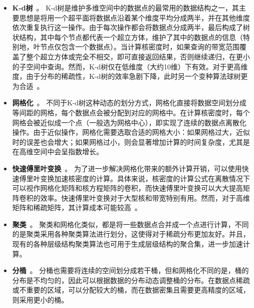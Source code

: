 \begin{itemize}[leftmargin=*]
	\item \textbf{K-d树}~\cite{chan_efficient_2020, chan_quad_2020, chan_karl_2019}。 K-d树是维护多维空间中的数据点的最常用的数据结构之一，其主要思想是将用一个超平面将数据点沿着某个维度平均分成两半，并在其他维度依次重复执行这一操作。由于每次操作都会将数据点分成两半，最后构成了树状结构，其中每个节点都代表一个超立方体，维护了其中的数据点的信息（特别地，叶节点仅包含一个数据点）。当计算核密度时，如果查询的带宽范围覆盖了整个超立方体或完全不相交，即可直接返回结果，否则继续递归，在更小的子空间中查询。然而，K-d树仅在低维度（大约10维）下有效。对于更高维度，由于分布的稀疏性，K-d树的效率急剧下降，此时另一个变种算法球树更为合适~\cite{gray_nonparametric_2003}。
	
	\item \textbf{网格化}~\cite{hart_kernel_2014, black_highway_1991}。 不同于K-d树这种动态的划分方式，网格化直接将数据空间划分成等间距的网格，每个数据点会被分配到对应的网格中。在计算核密度时，每个网格会被近似成一个点（一般选为网格中心），即实现了连续的数据点离散化操作。由于近似操作，网格化需要选取合适的网格大小：如果网格过大，近似时的误差也会增大；如果网格过小，则会显著增加计算的时间复杂度，尤其是在高维空间中会呈指数增长。
	
	\item \textbf{快速傅里叶变换}~\cite{silverman_algorithm_1982, gramacki_nonparametric_2018}。 为了进一步解决网格化带来的额外计算开销，可以使用快速傅里叶变换加速核密度的计算。具体来说，核密度的计算公式在离散情况下可以视作网格化矩阵和核方程矩阵的卷积，而快速傅里叶变换可以大大提高矩阵卷积的效率。快速傅里叶变换对于大型核和带宽特别有用。然而，对于高维矩阵和稀疏矩阵，其计算成本可能较高~\cite{fan_fast_1994}。
	
	\item \textbf{聚类}~\cite{auber_interactive_2005, abello_ask-graphview_2006, hinneburg_denclue_2007}。 聚类和网格化类似，都是将一些数据点合并成一个点进行计算，不同的是聚类采用各种聚类算法进行划分，这使得对于稀疏分布更加友好。并且，现有的各种层级结构聚类算法也可用于生成层级结构的聚合集，进一步加速计算。
	
	\item \textbf{分桶}~\cite{liu_immens_2013, gramacki_nonparametric_2018, li_interactive_2014}。 分桶也需要将连续的空间划分成若干桶，但和网格化不同的是，桶的分布是不均匀的，因此可以根据数据的分布动态调整桶的分布。在数据点稀疏或不重要的区域，可以分配较大的桶，而在数据密集且需要更高精度的区域，则采用更小的桶。
\end{itemize}

